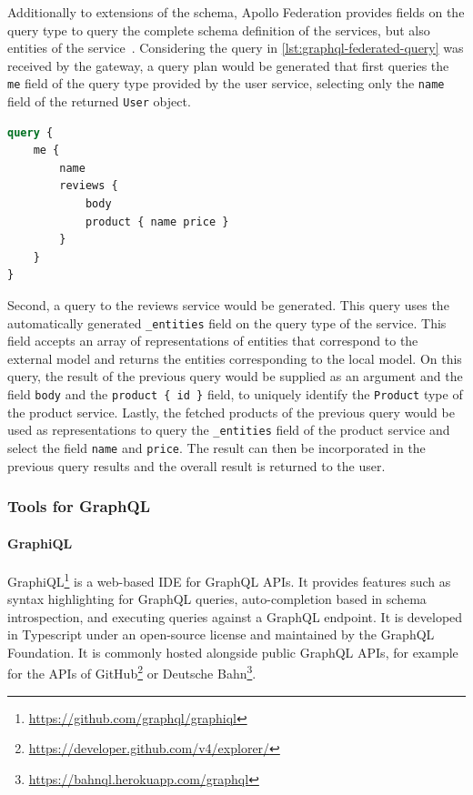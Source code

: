 Additionally to extensions of the schema, Apollo Federation provides fields on the query type to query the complete schema definition of the services, but also entities of the service~\cite{MDGa}.
Considering the query in \autoref{lst:graphql-federated-query} was received by the gateway, a query plan would be generated that first queries the \texttt{me} field of the query type provided by the user service, selecting only the \texttt{name} field of the returned \texttt{User} object.

\begin{lstlisting}[caption={Query to a Federated GraphQL \ac{API}~\cite{MDG}}, language=graphql, label={lst:graphql-federated-query}]
query {
    me {
        name
        reviews {
            body
            product { name price }
        }
    }
}
\end{lstlisting}

Second, a query to the reviews service would be generated.
This query uses the automatically generated \texttt{\_entities} field on the query type of the service.
This field accepts an array of representations of entities that correspond to the external model and returns the entities corresponding to the local model.
On this query, the result of the previous query would be supplied as an argument and the field \texttt{body} and the \texttt{product \{ id \}} field, to uniquely identify the \texttt{Product} type of the product service.
Lastly, the fetched products of the previous query would be used as representations to query the \texttt{\_entities} field of the product service and select the field \texttt{name} and \texttt{price}.
The result can then be incorporated in the previous query results and the overall result is returned to the user.

\subsubsection{Tools for GraphQL}


\paragraph{GraphiQL}

GraphiQL\footnote{\url{https://github.com/graphql/graphiql}} is a web-based \ac{IDE} for GraphQL \acp{API}.
It provides features such as syntax highlighting for GraphQL queries, auto-completion based in schema introspection, and executing queries against a GraphQL endpoint.
It is developed in Typescript under an open-source license and maintained by the GraphQL Foundation.
It is commonly hosted alongside public GraphQL \acp{API}, for example for the \acp{API} of GitHub\footnote{\url{https://developer.github.com/v4/explorer/}} or Deutsche Bahn\footnote{\url{https://bahnql.herokuapp.com/graphql}}.


